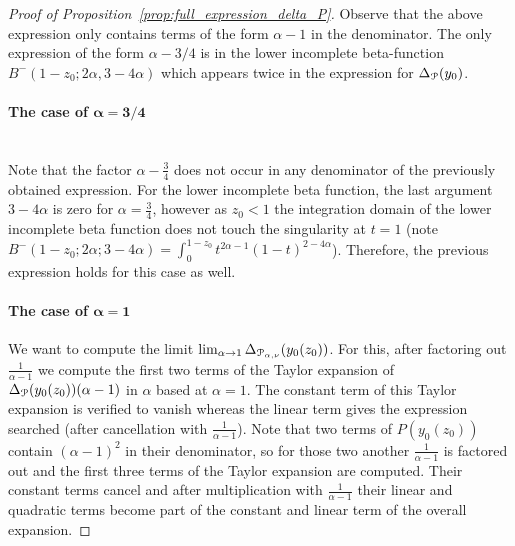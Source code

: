 \begin{proof}[Proof of Proposition~\ref{prop:full_expression_delta_P}]
Observe that the above expression only contains terms of the form $\alpha - 1$ in the denominator. The only expression of the form $\alpha - 3/4$ is in the lower incomplete beta-function $B^-(1 - z_0; 2 \alpha, 3 - 4 \alpha)$ which appears twice in the expression for $\Delta_{{\mathcal P}}(y_0)$. 

\paragraph{The case of $\bm{\alpha = 3/4}$}\hfil\\

Note that the factor $\alpha-\frac{3}{4}$ does not occur in any denominator of the previously obtained expression. For the lower incomplete beta function, the last argument $3-4\alpha$ is zero for $\alpha=\frac{3}{4}$, however as $z_0 < 1$ the integration domain of the lower incomplete beta function does not touch the singularity at $t=1$ (note $B^-(1-z_0;2\alpha;3-4\alpha) = \int_0^{1-z_0} t^{2\alpha-1} (1-t)^{2-4\alpha}$). Therefore, the previous expression holds for this case as well.


\paragraph{The case of $\bm{\alpha = 1}$}

We want to compute the limit $\lim_{\alpha \rightarrow 1} \Delta_{{\mathcal P}_{\alpha,\nu}}(y_0(z_0))$. For this, after factoring out $\frac{1}{\alpha-1}$ we compute the first two terms of the Taylor expansion of $\Delta_{{\mathcal P}}(y_0(z_0))(\alpha-1)$ in $\alpha$ based at $\alpha = 1$. The constant term of this Taylor expansion is verified to vanish whereas the linear term gives the expression searched (after cancellation with $\frac{1}{\alpha-1}$). Note that two terms of $P(y_0(z_0))$ contain $(\alpha-1)^2$ in their denominator, so for those two another $\frac{1}{\alpha-1}$ is factored out and the first three terms of the Taylor expansion are computed. Their constant terms cancel and after multiplication with $\frac{1}{\alpha-1}$ their linear and quadratic terms become part of the constant and linear term of the overall expansion.


\end{proof}
